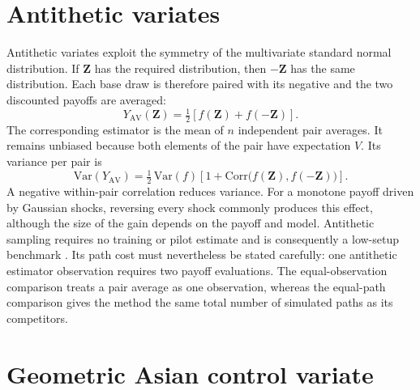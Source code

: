 \section{Antithetic variates}

Antithetic variates exploit the symmetry of the multivariate standard normal distribution. If $\mathbf{Z}$ has the required distribution, then $-\mathbf{Z}$ has the same distribution. Each base draw is therefore paired with its negative and the two discounted payoffs are averaged:
\begin{equation}
Y_{\mathrm{AV}}(\mathbf{Z}) = \tfrac{1}{2}\left[f(\mathbf{Z}) + f(-\mathbf{Z})\right].
\label{eq:av_observation}
\end{equation}
The corresponding estimator is the mean of $n$ independent pair averages. It remains unbiased because both elements of the pair have expectation $V$. Its variance per pair is
\begin{equation}
\mathrm{Var}(Y_{\mathrm{AV}}) = \tfrac{1}{2} \, \mathrm{Var}(f)\left[1 + \mathrm{Corr}\bigl(f(\mathbf{Z}), f(-\mathbf{Z})\bigr)\right].
\label{eq:av_variance}
\end{equation}
A negative within-pair correlation reduces variance. For a monotone payoff driven by Gaussian shocks, reversing every shock commonly produces this effect, although the size of the gain depends on the payoff and model. Antithetic sampling requires no training or pilot estimate and is consequently a low-setup benchmark \parencite{hammersley_morton_1956}. Its path cost must nevertheless be stated carefully: one antithetic estimator observation requires two payoff evaluations. The equal-observation comparison treats a pair average as one observation, whereas the equal-path comparison gives the method the same total number of simulated paths as its competitors.

\section{Geometric Asian control variate}

